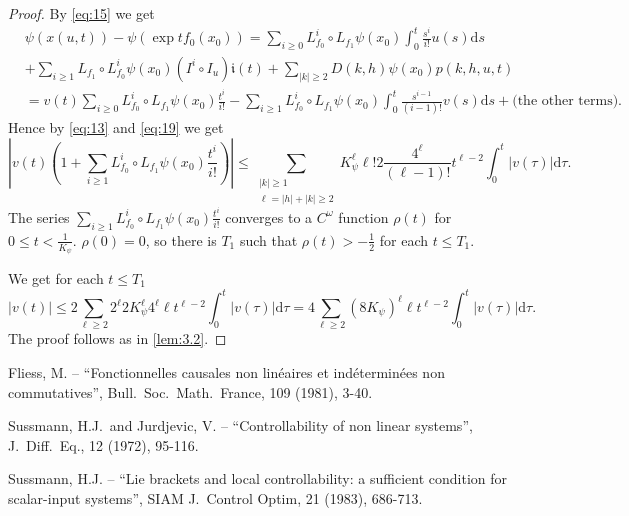 \documentclass{article}
\newcommand{\dd}{\mathrm{d}}
\begin{document}
\begin{proof}
	By \eqref{eq:15} we get
	\begin{equation*}
		\begin{split}
			& \psi(x(u, t)) -\psi(\exp t f_0(x_0)) = \sum_{i\geq 0} L_{f_0}^i \circ L_{f_1} \psi(x_0) \int_0^t \frac{s^i}{i!} u(s) \dd s \\
			& + \sum_{i \geq 1} L_{f_1} \circ L_{f_0}^i \psi\left(x_0\right) \left(I^i \circ I_u\right) \mathfrak{i}(t)+\sum_{|k| \geq 2} D(k, h) \psi\left(x_0\right) p(k, h, u, t) \\
			& =v(t) \sum_{i \geq 0} L_{f_0}^i \circ L_{f_1} \psi\left(x_0\right) \frac{t^i}{i !}-\sum_{i \geq 1} L_{f_0}^i \circ L_{f_1} \psi\left(x_0\right) \int_0^t \frac{s^{i-1}}{(i-1) !} v(s) \dd s+ \text{(the other terms).}
		\end{split}
	\end{equation*}
	Hence by \eqref{eq:13} and \eqref{eq:19} we get
	\begin{equation*}
		\left|v(t)\left(1+\sum_{i \geq 1} L_{f_0}^i \circ L_{f_1} 	\psi\left(x_0\right) \frac{t^i}{i!}\right)\right| 
		\leq
		 \sum_{\substack{|k| \geq 1 \\ \ell=| h|+| k \mid \geq 2}} K_\psi^{\ell} \ell ! 2 \frac{4^\ell}{(\ell-1) !} t^{\ell-2} \int_0^t|v(\tau)| \dd \tau .
	\end{equation*}
	The series $\sum_{i \geq 1} L_{f_0}^i \circ L_{f_1} \psi\left(x_0\right) \frac{t^i}{i!}$ converges to a $C^\omega$ function $\rho(t)$ for $0 \leq t<\frac{1}{K_\psi}$. $\rho(0)=0$, so there is $T_1$ such that $\rho(t)>-\frac{1}{2}$ for each $t \leq T_1$.
	
	We get for each $t \leq T_1$
	\begin{equation*}
		|v(t)| \leq 2 \sum_{\ell \geq 2} 2^{\ell} 2 K_\psi^{\ell} 4^{\ell} \ell t^{\ell-2} \int_0^t|v(\tau)| \dd \tau=4 \sum_{\ell \geq 2}\left(8 K_\psi\right)^{\ell} \ell t^{\ell-2} \int_0^t|v(\tau)| \dd \tau .
	\end{equation*}
	The proof follows as in \cref{lem:3.2}.
\end{proof}

\begin{thebibliography}{99}
	Fliess, M. --
	``Fonctionnelles causales non linéaires et indéterminées non commutatives'',
	Bull.~Soc.~Math.~France, 109 (1981), 3-40.
	
	Sussmann, H.J.\ and Jurdjevic, V. --
	``Controllability of non linear systems'',
	J.~Diff.~Eq., 12 (1972), 95-116.
	
	Sussmann, H.J. --
	``Lie brackets and local controllability: a sufficient condition for scalar-input systems'', 
	SIAM J.~Control Optim, 21 (1983), 686-713.
\end{thebibliography}
\end{document}

